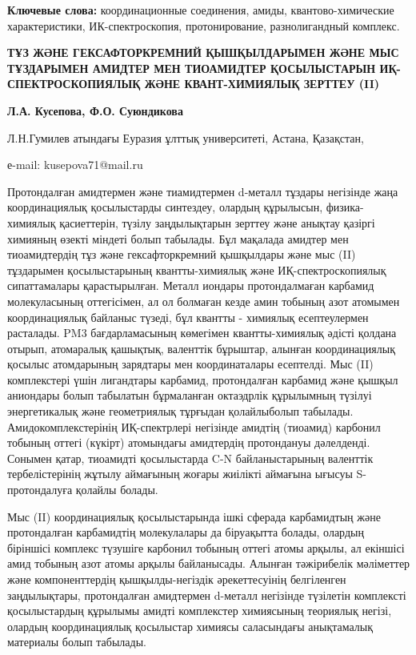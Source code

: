 {\bfseries Ключевые слова:} координационные соединения, амиды,
квантово-химические характеристики, ИК-спектроскопия, протонирование,
разнолигандный комплекс.

\begin{center}
{\large\bfseries ТҰЗ ЖӘНЕ ГЕКСАФТОРКРЕМНИЙ ҚЫШҚЫЛДАРЫМЕН ЖӘНЕ МЫС ТҰЗДАРЫМЕН
АМИДТЕР МЕН ТИОАМИДТЕР ҚОСЫЛЫСТАРЫН ИҚ-СПЕКТРОСКОПИЯЛЫҚ ЖӘНЕ
КВАНТ-ХИМИЯЛЫҚ ЗЕРТТЕУ (II)}

{\bfseries Л.А. Кусепова\envelope, Ф.О. Суюндикова}

Л.Н.Гумилев атындағы Еуразия ұлттық университеті, Астана, Қазақстан,

е-mail: kusepova71@mail.ru
\end{center}

Протондалған амидтермен және тиамидтермен d-металл тұздары негізінде
жаңа координациялық қосылыстарды синтездеу, олардың құрылысын,
физика-химиялық қасиеттерін, түзілу заңдылықтарын зерттеу және анықтау
қазіргі химияның өзекті міндеті болып табылады. Бұл мақалада амидтер мен
тиоамидтердің тұз және гексафторкремний қышқылдары және мыс (II)
тұздарымен қосылыстарының квантты-химиялық және ИҚ-спектроскопиялық
сипаттамалары қарастырылған. Металл иондары протондалмаған карбамид
молекуласының оттегісімен, ал ол болмаған кезде амин тобының азот
атомымен координациялық байланыс түзеді, бұл квантты - химиялық
есептеулермен расталады. PM3 бағдарламасының көмегімен квантты-химиялық
әдісті қолдана отырып, атомаралық қашықтық, валенттік бұрыштар, алынған
координациялық қосылыс атомдарының зарядтары мен координаталары
есептелді. Мыс (II) комплекстері үшін лигандтары карбамид, протондалған
карбамид және қышқыл аниондары болып табылатын бұрмаланған октаэдрлік
құрылымның түзілуі энергетикалық және геометриялық тұрғыдан қолайлыболып
табылады. Амидокомплекстерінің ИҚ-спектрлері негізінде амидтің (тиоамид)
карбонил тобының оттегі (күкірт) атомындағы амидтердің протондануы
дәлелденді. Сонымен қатар, тиоамидті қосылыстарда C-N байланыстарының
валенттік тербелістерінің жұтылу аймағының жоғары жиілікті аймағына
ығысуы S-протондалуға қолайлы болады.

Мыс (II) координациялық қосылыстарында ішкі сферада карбамидтың және
протондалған карбамидтің молекулалары да біруақытта болады, олардың
біріншісі комплекс түзушіге карбонил тобының оттегі атомы арқылы, ал
екіншісі амид тобының азот атомы арқылы байланысады. Алынған тәжірибелік
мәліметтер және компоненттердің қышқылды-негіздік әрекеттесуінің
белгіленген заңдылықтары, протондалған амидтермен d-металл негізінде
түзілетін комплексті қосылыстардың құрылымы амидті комплекстер
химиясының теориялық негізі, олардың координациялық қосылыстар химиясы
саласындағы анықтамалық материалы болып табылады.


